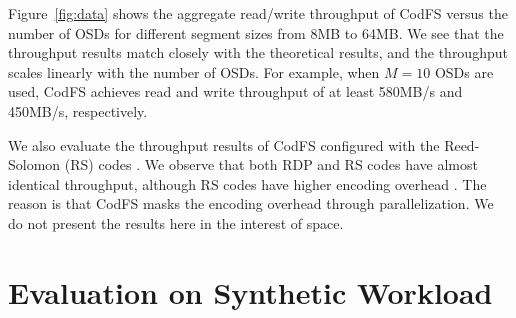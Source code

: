 Figure~\ref{fig:data} shows the aggregate read/write throughput of CodFS
versus the number of OSDs for different segment sizes from 8MB to 64MB. We see
that the throughput results match closely with the theoretical results, and the
throughput scales linearly with the number of OSDs.  For example, when $M=10$
OSDs are used, CodFS achieves read and write throughput of at least 580MB/s
and 450MB/s, respectively.  

We also evaluate the throughput results of CodFS configured with the
Reed-Solomon (RS) codes \cite{reed60}.   We observe that both RDP and RS codes
have almost identical throughput, although RS codes have higher encoding
overhead \cite{plank09}.  The reason is that CodFS masks the encoding overhead
through parallelization.  We do not present the results here in the interest
of space. 

\section{Evaluation on Synthetic Workload}
\label{eval:synthetic}

